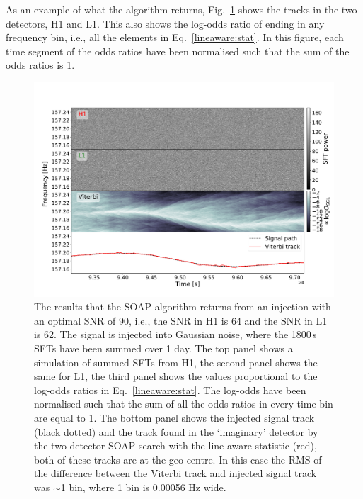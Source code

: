%
%
As an example of what the algorithm returns, Fig.~\ref{viterbi:tracks} shows
the tracks in the two detectors, H1 and L1. This also shows the
log-odds ratio of ending in any
frequency bin, i.e., all the elements in Eq.~\ref{lineaware:stat}.  In this figure, each time segment of the odds ratios have been normalised such that the sum of the odds ratios is 1.



\begin{figure}
\includegraphics[scale=0.45]{C3_soap/viterbi_tracks.pdf}
%
\caption{\label{viterbi:tracks} The results that the SOAP algorithm returns from an injection with an optimal
\ac{SNR} of 90, i.e., the \ac{SNR} in H1 is 64 and the \ac{SNR} in L1 is 62.
The signal is injected into Gaussian noise, where the 1800\,s \acp{SFT} have been
summed over 1 day.  The top panel shows a simulation of summed \acp{SFT} from H1, the second panel shows the same for L1,
the third panel shows the values proportional to the
log-odds ratios in Eq.~\ref{lineaware:stat}.
The log-odds have been normalised such that the sum of
all the odds ratios in every time bin are equal to 1. The bottom panel shows the injected signal track (black dotted) and the track found in the `imaginary' detector by the two-detector SOAP search with the line-aware statistic (red), both of these tracks are at the geo-centre. In this case the \ac{RMS} of the difference between the Viterbi track and injected signal track was $\sim$1 bin, where 1 bin is 0.00056 Hz wide.}
%
\end{figure}


